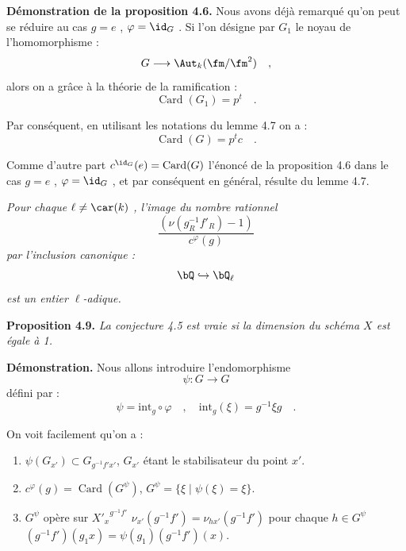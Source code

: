 \medskip

\noindent
\textbf{Démonstration de la proposition 4.6.} Nous avons déjà remarqué qu'on peut se réduire au cas $g = e$ , $\varphi = \id_G$ . Si l'on désigne par $G_1$ le noyau de l'homomorphisme :
\[
G \longrightarrow \Aut_k(\fm/\fm^2) \quad ,
\]
alors on a grâce à la théorie de la ramification :
\[
\operatorname{Card}(G_1) = p^t \quad .
\]

Par conséquent, en utilisant les notations du lemme 4.7 on a :
\[
\operatorname{Card}(G) = p^t c \quad .
\]

Comme d'autre part $c^{\id_G}(e) = \operatorname{Card}(G)$ l'énoncé de la proposition 4.6 dans le cas $g = e$ , $\varphi = \id_G$ , et par conséquent en général, résulte du lemme 4.7.

\medskip
\noindent
{} \emph{Pour chaque $\ell \neq \car(k)$ , l'image du nombre rationnel
\[
\frac{(\nu(g_R^{-1}f'_R) - 1)}{c^\varphi(g)}
\]
par l'inclusion canonique :
\[
\bQ \hookrightarrow \bQ_\ell
\]
est un entier $\ell$-adique.}

\medskip
\noindent
\textbf{Proposition 4.9.} \emph{La conjecture 4.5 est vraie si la dimension du schéma $X$ est égale à 1.}

\medskip

\noindent
\textbf{Démonstration.} Nous allons introduire l'endomorphisme
\[
\psi : G \longrightarrow G
\]
défini par :
\[
\psi = \mathrm{int}_g \circ \varphi \quad , \quad \mathrm{int}_g(\xi) = g^{-1}\xi g \quad .
\]

On voit facilement qu'on a :
\begin{enumerate}
\item[i)] $\psi(G_{x'}) \subset G_{g^{-1}f'x'}$, $G_{x'}$ étant le stabilisateur du point $x'$.
\item[ii)] $c^\varphi(g) = \operatorname{Card}(G^\psi)$, $G^\psi = \{ \xi \mid \psi(\xi) = \xi \}$.
\item[iii)] $G^\psi$ opère sur ${X'_x}^{g^{-1}f'}$
 $\nu_{x'}(g^{-1}f') = \nu_{hx'}(g^{-1}f')$ pour chaque $h \in G^\psi$
 $(g^{-1}f')(g_1x) = \psi(g_1)(g^{-1}f')(x)$.
\end{enumerate}

